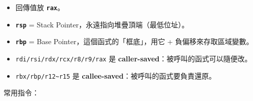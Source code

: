 \documentclass[10pt,a4paper]{article}
\providecommand{\tightlist}{%
  \setlength{\itemsep}{0pt}\setlength{\parskip}{0pt}}
\begin{document}
\begin{itemize}
\tightlist
\item
  回傳值放 \textbf{\texttt{rax}}。
\item
  \textbf{\texttt{rsp}} = Stack Pointer，永遠指向堆疊頂端（最低位址）。
\item
  \textbf{\texttt{rbp}} = Base Pointer，這個函式的「框底」，用它 +
  負偏移來存取區域變數。
\item
  \texttt{rdi/\allowbreak{}rsi/\allowbreak{}rdx/\allowbreak{}rcx/\allowbreak{}r8/\allowbreak{}r9/\allowbreak{}rax} 是
  \textbf{caller-saved}：被呼叫的函式可以隨便改。
\item
  \texttt{rbx/\allowbreak{}rbp/\allowbreak{}r12\textasciitilde{}\allowbreak{}r15} 是
  \textbf{callee-saved}：被呼叫的函式要負責還原。
\end{itemize}

常用指令：
\end{document}
